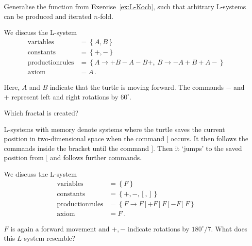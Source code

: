 \subexercise[
    topic = General L-Systems
]
\label{ex:L-allg}

Generalise the function from Exercise~\ref{ex:L-Koch}, such that arbitrary L-systems can be produced and iterated $n$-fold.


\exercise[
    topic = Creating Fractals
]


We discuss the  L-system
\begin{subequations}
    \label{eq:Sierpinski-L}
\begin{align}
    \mathrm{variables} &= \left\{A,B\right\} \\
    \mathrm{constants} &= \left\{+,-\right\} \\
    \mathrm{production rules} &= \left\{A\rightarrow +B-A-B+,\
        B\rightarrow -A+B+A-\right\} \\
    \mathrm{axiom} &= A\,.
\end{align}
\end{subequations}

Here, $A$ and $B$ indicate that the turtle is moving forward. The commands $-$ and $+$ represent left and right rotations by  $60^\circ$.

Which fractal is created?

\subexercise[  
topic = Optional: L-Systems with Memory
]

L-systems with memory denote systems where the turtle saves the current position in two-dimensional space when the command $[$ occurs. It then follows the commands inside the bracket until the command $]$. Then it `jumps' to the saved position from $[$ and follows further commands. 

We discuss the L-system 
\begin{subequations}
    \label{eq:Farn-L}
\begin{align}
    \mathrm{variables} &= \left\{F\right\} \\
    \mathrm{constants} &= \left\{+,-,[,]\right\} \\
    \mathrm{production rules} &= \left\{ F \rightarrow
        F[+F]F[-F]F\right\}\\
\mathrm{axiom} &= F\,.
\end{align}
\end{subequations}

$F$ is again a forward movement and $+,-$ indicate rotations by $180^\circ/7$. What does this $L$-system resemble? 
